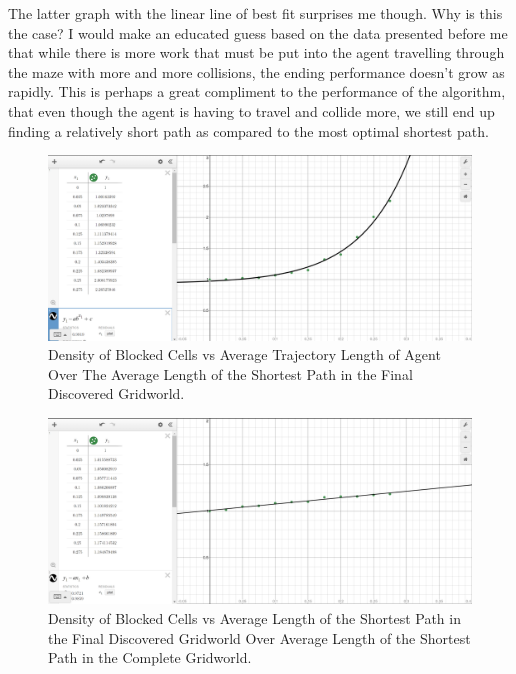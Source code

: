 \documentclass{homeworg}
\begin{document}
The latter graph with the linear line of best fit surprises me though. Why is this the case? I would make an educated guess based on the data presented before me that while there is more work that must be put into the agent travelling through the maze with more and more collisions, the ending performance doesn't grow as rapidly. This is perhaps a great compliment to the performance of the algorithm, that even though the agent is having to travel and collide more, we still end up finding a relatively short path as compared to the most optimal shortest path. 

\begin{figure}[h]
  	\centering
  	\includegraphics*[scale=0.3]{Q6 Density vs Avg Trajectory Length Over Length in Final Discovered Gridworld.png}
	\caption{Density of Blocked Cells vs Average Trajectory Length of Agent Over The Average Length of the Shortest Path in the Final Discovered Gridworld.}
	\label{fig:example}
\end{figure}

\begin{figure}[h]
  	\centering
  	\includegraphics*[scale=0.3]{Q6 Density vs Avg Length in Final Discovered Gridworld Over Length in Complete Gridworld.png}
	\caption{Density of Blocked Cells vs Average Length of the Shortest Path in the Final Discovered Gridworld Over Average Length of the Shortest Path in the Complete Gridworld.}
	\label{fig:example}
\end{figure}
\end{document}
